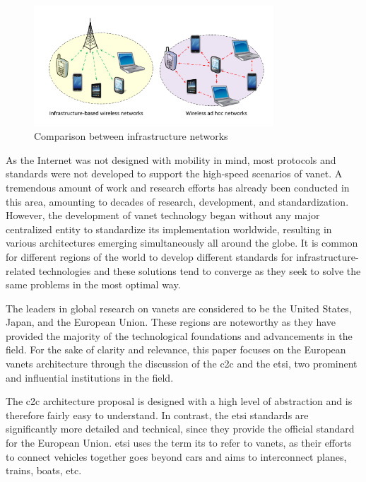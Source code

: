 \begin{figure}[htbp]
	\centering
	\includegraphics[width=0.8\textwidth]{Chapters/Figures/VANETs/ad_hoc_networks.png}
	\caption{Comparison between infrastructure networks~\cite{dinh_thai_applications_2015}}
	\label{fig:ad_hoc}
\end{figure}


As the Internet was not designed with mobility in mind, most protocols and standards were not developed to support the high-speed scenarios of \gls{vanet}. A tremendous amount of work and research efforts has already been conducted in this area, amounting to decades of research, development, and standardization. However, the development of \gls{vanet} technology began without any major centralized entity to standardize its implementation worldwide, resulting in various architectures emerging simultaneously all around the globe. It is common for different regions of the world to develop different standards for infrastructure-related technologies and these solutions tend to converge as they seek to solve the same problems in the most optimal way. 

The leaders in global research on \glspl{vanet} are considered to be the United States, Japan, and the European Union. These regions are noteworthy as they have provided the majority of the technological foundations and advancements in the field. For the sake of clarity and relevance, this paper focuses on the European \glspl{vanet} architecture through the discussion of the \gls{c2c} and the \gls{etsi}, two prominent and influential institutions in the field. 

The \gls{c2c} architecture proposal is designed with a high level of abstraction and is therefore fairly easy to understand. In contrast, the \gls{etsi} standards are significantly more detailed and technical, since they provide the official standard for the European Union. \gls{etsi} uses the term \gls{its} to refer to \glspl{vanet}, as their efforts to connect vehicles together goes beyond cars and aims to interconnect planes, trains, boats, etc.

